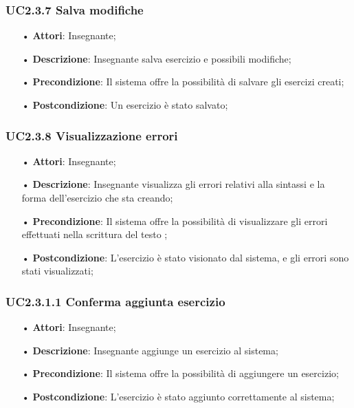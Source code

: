 \subsubsection{UC2.3.7	Salva modifiche}
\begin{itemize}
	\item[•] \textbf{Attori}: Insegnante;
	\item[•] \textbf{Descrizione}: Insegnante salva esercizio e possibili modifiche;
	\item[•] \textbf{Precondizione}: Il sistema offre la possibilità di salvare gli esercizi creati;
	\item[•] \textbf{Postcondizione}: Un esercizio è stato salvato;
\end{itemize}

\subsubsection{UC2.3.8 Visualizzazione errori}
\begin{itemize}
	\item[•] \textbf{Attori}: Insegnante;
	\item[•] \textbf{Descrizione}: Insegnante visualizza gli errori relativi alla sintassi e la forma dell’esercizio che sta creando;
	\item[•] \textbf{Precondizione}: Il sistema offre la possibilità di visualizzare gli errori effettuati nella scrittura del testo ;
	\item[•] \textbf{Postcondizione}: L’esercizio è stato visionato dal sistema, e gli errori sono stati visualizzati;
\end{itemize}

\subsubsection{UC2.3.1.1 Conferma aggiunta esercizio}
\begin{itemize}
	\item[•] \textbf{Attori}: Insegnante;
	\item[•] \textbf{Descrizione}: Insegnante aggiunge un esercizio al sistema;
	\item[•] \textbf{Precondizione}: Il sistema offre la possibilità di aggiungere un esercizio;
	\item[•] \textbf{Postcondizione}: L’esercizio è stato aggiunto correttamente al sistema;
\end{itemize}

